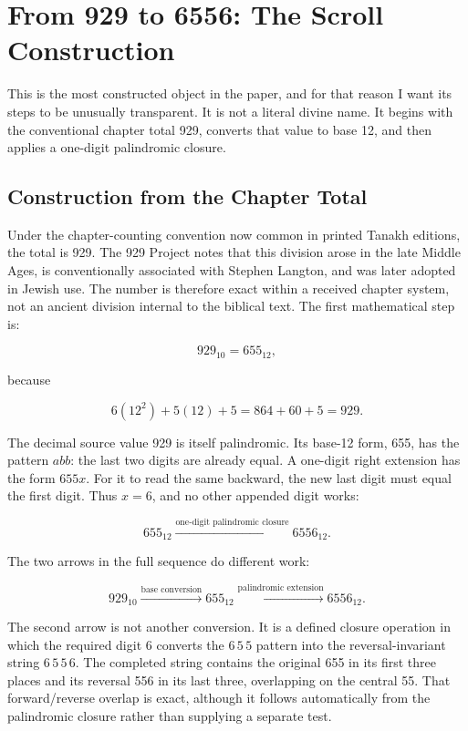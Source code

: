\section{From 929 to 6556: The Scroll Construction}

This is the most constructed object in the paper, and for that reason I want its steps to be unusually transparent. It is not a literal divine name. It begins with the conventional chapter total 929, converts that value to base 12, and then applies a one-digit palindromic closure.

\subsection{Construction from the Chapter Total}

Under the chapter-counting convention now common in printed Tanakh editions, the total is 929. The 929 Project notes that this division arose in the late Middle Ages, is conventionally associated with Stephen Langton, and was later adopted in Jewish use.\cite{project929,verse_division} The number is therefore exact within a received chapter system, not an ancient division internal to the biblical text. The first mathematical step is:

\[
929_{10}=655_{12},
\]

because

\[
6(12^2)+5(12)+5=864+60+5=929.
\]

The decimal source value 929 is itself palindromic. Its base-12 form, 655, has the pattern $abb$: the last two digits are already equal. A one-digit right extension has the form $655x$. For it to read the same backward, the new last digit must equal the first digit. Thus $x=6$, and no other appended digit works:

\[
655_{12}\xrightarrow{\text{one-digit palindromic closure}}6556_{12}.
\]

The two arrows in the full sequence do different work:

\[
929_{10}\xrightarrow{\text{base conversion}}655_{12}
\xrightarrow{\text{palindromic extension}}6556_{12}.
\]

The second arrow is not another conversion. It is a defined closure operation in which the required digit 6 converts the $6\,5\,5$ pattern into the reversal-invariant string $6\,5\,5\,6$. The completed string contains the original 655 in its first three places and its reversal 556 in its last three, overlapping on the central 55. That forward/reverse overlap is exact, although it follows automatically from the palindromic closure rather than supplying a separate test.

